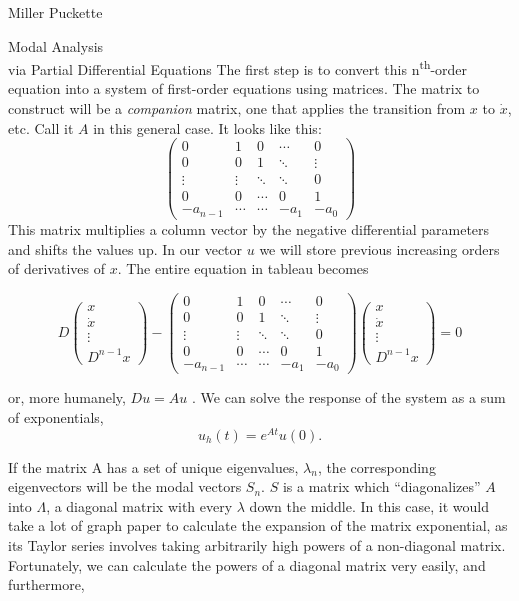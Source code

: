 \documentclass[a4paper,10pt]{report}
\numberwithin{equation}{section}
\begin{document}
\begin{chapter}{Miller Puckette}
\begin{section}{Modal Analysis \\via Partial Differential Equations}
The first step is to convert this n\textsuperscript{th}-order equation into a system of first-order equations using matrices. The matrix to construct will be a \emph{companion} matrix, one that applies the transition from $x$ to $\dot{x}$, etc. Call it $A$ in this general case. It looks like this:
\begin{equation}\label{companion}
\begin{pmatrix}
0 &1 &0 &\cdots &0\\
0 &0 &1 &\ddots &\vdots\\
\vdots &\vdots &\ddots &\ddots &0\\
0 &0 &\cdots &0 &1\\
-a_{n-1} &\cdots &\cdots &-a_1 &-a_0
\end{pmatrix}
\end{equation}
This matrix multiplies a column vector by the negative differential parameters and shifts the values up. In our vector $u$ we will store previous increasing orders of derivatives of $x$. The entire equation in tableau becomes\cite[p.~17]{Reid1992}

\begin{equation}
 D \begin{pmatrix}
      x\\
      \dot{x}\\
      \vdots\\
      D^{n-1}x
     \end{pmatrix}
-
\begin{pmatrix}
0 &1 &0 &\cdots &0\\
0 &0 &1 &\ddots &\vdots\\
\vdots &\vdots &\ddots &\ddots &0\\
0 &0 &\cdots &0 &1\\
-a_{n-1} &\cdots &\cdots &-a_1 &-a_0
\end{pmatrix}
\begin{pmatrix}
      x\\
      \dot{x}\\
      \vdots\\
      D^{n-1}x
     \end{pmatrix}
= 0
\end{equation}


or, more humanely, $Du = Au$ . We can solve the response of the system as a sum of exponentials,
\begin{equation}\label{homogeneous_exp}
u_h(t) = e^{At}u(0) \text{.}
\end{equation}

If the matrix A has a set of unique eigenvalues, $\lambda_n$, the corresponding eigenvectors will be the modal vectors $S_n$. $S$ is a matrix which ``diagonalizes'' $A$ into $\Lambda$, a diagonal matrix with every $\lambda$ down the middle. In this case, it would take a lot of graph paper to calculate the expansion of the matrix exponential, as its Taylor series involves taking arbitrarily high powers of a non-diagonal matrix. Fortunately, we can calculate the powers of a diagonal matrix very easily, and furthermore,\cite[p.~20]{Reid1992}


\end{section}
\end{chapter}
\end{document}
